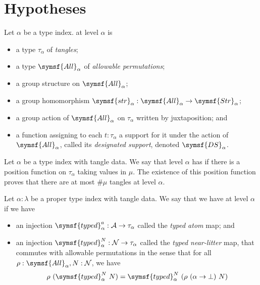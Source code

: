 \section{Hypotheses}

\begin{definition}
    Let \( \alpha \) be a type index.
     at level \( \alpha \) is
    \begin{itemize}
        \item a type \( \tau_\alpha \) of \emph{tangles};
        \item a type \( \symsf{All}_\alpha \) of \emph{allowable permutations};
        \item a group structure on \( \symsf{All}_\alpha \);
        \item a group homomorphism \( \symsf{str}_\alpha : \symsf{All}_\alpha \to \symsf{Str}_\alpha \);
        \item a group action of \( \symsf{All}_\alpha \) on \( \tau_\alpha \) written by juxtaposition; and
        \item a function assigning to each \( t : \tau_\alpha \) a support for it under the action of \( \symsf{All}_\alpha \), called its \emph{designated support}, denoted \( \symsf{DS}_\alpha \).
    \end{itemize}
\end{definition}
\begin{definition}
    Let \( \alpha \) be a type index with tangle data.
    We say that level \( \alpha \) has  if there is a position function on \( \tau_\alpha \) taking values in \( \mu \).
    The existence of this position function proves that there are at most \( \#\mu \) tangles at level \( \alpha \).
\end{definition}
\begin{definition}
    Let \( \alpha : \lambda \) be a proper type index with tangle data.
    We say that we have  at level \( \alpha \) if we have
    \begin{itemize}
        \item an injection \( \symsf{typed}^a_\alpha : \mathcal A \to \tau_\alpha \) called the \emph{typed atom} map; and
        \item an injection \( \symsf{typed}^N_\alpha : \mathcal N \to \tau_\alpha \) called the \emph{typed near-litter} map, that commutes with allowable permutations in the sense that for all \( \rho : \symsf{All}_\alpha, N : \mathcal N \), we have
        \[ \rho\ (\symsf{typed}^N_\alpha\ N) = \symsf{typed}^N_\alpha\ (\rho\ (\alpha \to \bot)\ N) \]
    \end{itemize}
\end{definition}
